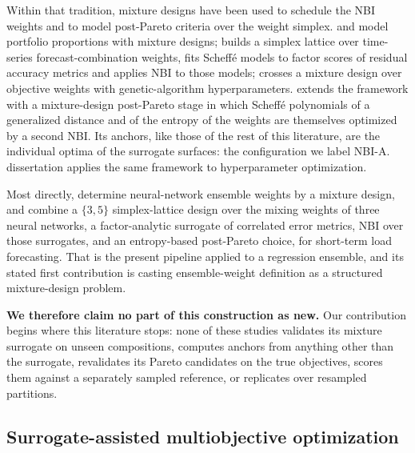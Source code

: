 Within that tradition, mixture designs have been used to schedule the NBI weights and to model post-Pareto criteria
over the weight simplex. \citet{mendes2016portfolio_mde} and \citet{leal2022portfolio_doptimal_mde} model portfolio
proportions with mixture designs; \citet{bacci2019nbi_mixture} builds a simplex lattice over time-series
forecast-combination weights, fits Scheffé models to factor scores of residual accuracy metrics and applies NBI to
those models; \citet{paula2019gatuning} crosses a mixture design over objective weights with genetic-algorithm
hyperparameters. \citet{pereira2025hybrid} extends the framework
with a mixture-design post-Pareto stage in which Scheffé polynomials of a generalized distance and of the entropy of
the weights are themselves optimized by a second NBI. Its anchors, like those of the rest of this literature, are the
individual optima of the surrogate surfaces: the configuration we label NBI-A. 
dissertation \citep{ribeiro2026dissertation} applies the same framework to hyperparameter optimization.

Most directly, \citet{moreira2021ann_ensemble_mde} determine neural-network ensemble weights by a mixture design, and
\citet{rocha2025ensemblestlf} combine a $\{3,5\}$ simplex-lattice design over the mixing weights of three neural
networks, a factor-analytic surrogate of correlated error metrics, NBI over those surrogates, and an entropy-based
post-Pareto choice, for short-term load forecasting. That is the present pipeline applied to a regression ensemble, and
its stated first contribution is casting ensemble-weight definition as a structured mixture-design problem.

\textbf{We therefore claim no part of this construction as new.} Our contribution begins where this literature stops:
none of these studies validates its mixture surrogate on unseen compositions, computes anchors from anything other than
the surrogate, revalidates its Pareto candidates on the true objectives, scores them against a separately sampled
reference, or replicates over resampled partitions.

\subsection{Surrogate-assisted multiobjective optimization}
\label{sec:rel:surrogate}

